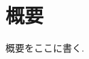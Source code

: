 \documentclass[a4paper, 12pt, dvipdfmx, uplatex]{jsreport}
\begin{document}
\chapter*{概要}
概要をここに書く.
\end{document}
